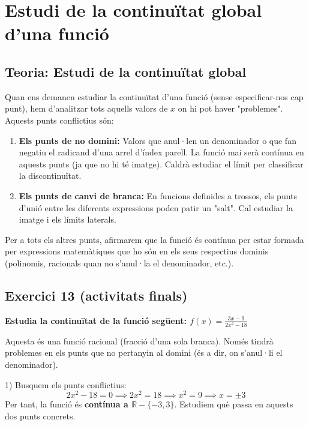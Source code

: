 \documentclass[12pt,a4paper]{article}
\begin{document}
\newpage

\section{Estudi de la continuïtat global d'una funció}

\subsection{Teoria: Estudi de la continuïtat global}

Quan ens demanen estudiar la continuïtat d'una funció (sense especificar-nos cap punt), hem d'analitzar tots aquells valors de $x$ on hi pot haver "problemes". Aquests punts conflictius són:
\begin{enumerate}
    \item \textbf{Els punts de no domini:} Valors que anul·len un denominador o que fan negatiu el radicand d'una arrel d'índex parell. La funció mai serà contínua en aquests punts (ja que no hi té imatge). Caldrà estudiar el límit per classificar la discontinuïtat.
    \item \textbf{Els punts de canvi de branca:} En funcions definides a trossos, els punts d'unió entre les diferents expressions poden patir un "salt". Cal estudiar la imatge i els límits laterals.
\end{enumerate}

Per a tots els altres punts, afirmarem que la funció és contínua per estar formada per expressions matemàtiques que ho són en els seus respectius dominis (polinomis, racionals quan no s'anul·la el denominador, etc.).

\vspace{0.5cm}

\subsection{Exercici 13 (activitats finals)}

\textbf{Estudia la continuïtat de la funció següent: $f(x) = \frac{3x-9}{2x^2-18}$}

Aquesta és una funció racional (fracció d'una sola branca). Només tindrà problemes en els punts que no pertanyin al domini (és a dir, on s'anul·li el denominador).

1) Busquem els punts conflictius:
\[ 2x^2-18 = 0 \implies 2x^2 = 18 \implies x^2 = 9 \implies x = \pm 3 \]
Per tant, la funció és \textbf{contínua a $\mathbb{R} - \{-3, 3\}$}. Estudiem què passa en aquests dos punts concrets.
\end{document}
